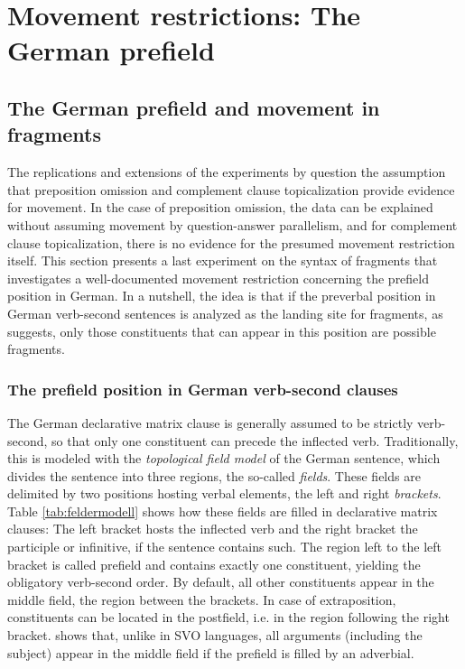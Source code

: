 \section{Movement restrictions: The German prefield}\label{sec:mvb}
\subsection{The German prefield and movement in fragments}
The replications and extensions of the experiments by \citet{merchant.etal2013} question the assumption that preposition omission and complement clause topicalization provide evidence for movement. In the case of preposition omission, the data can be explained without assuming movement by question-answer parallelism, and for complement clause topicalization, there is no evidence for the presumed movement restriction itself. This section presents a last experiment on the syntax of fragments that investigates a well-documented movement restriction concerning the prefield position in German. In a nutshell, the idea is that if the preverbal position in German verb-second sentences is analyzed as the landing site for fragments, as \citet{merchant2004} suggests, only those constituents that can appear in this position are possible fragments.

\subsubsection{The prefield position in German verb-second clauses}\largerpage
The German declarative matrix clause is generally assumed to be strictly verb-second, so that only one constituent can precede the inflected verb. Traditionally, this is modeled with the \textit{topological field model} \citep{drach1937} of the German sentence, which divides the sentence into three regions, the so-called \textit{fields}. These fields are delimited by two positions hosting verbal elements, the left and right \textit{brackets}. Table \ref{tab:feldermodell} shows how these fields are filled in declarative matrix clauses: The left bracket hosts the inflected verb and the right bracket the participle or infinitive, if the sentence contains such. The region left to the left bracket is called prefield and contains exactly one constituent, yielding the obligatory verb-second order. By default, all other constituents appear in the middle field, the region between the brackets. In case of extraposition, constituents can be located in the postfield, i.e. in the region following the right bracket. \Next shows that, unlike in SVO languages, all arguments (including the subject) appear in the middle field if the prefield is filled by an adverbial.

